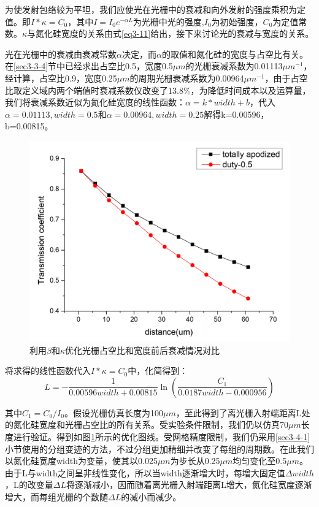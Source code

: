 \documentclass[UTF8,a4paper,12pt]{ctexart}
\numberwithin{equation}{section}
\begin{document}
为使发射包络较为平坦，我们应使光在光栅中的衰减和向外发射的强度乘积为定值。即$I*\kappa=C_0$，其中$I=I_0e^{-\alpha L}$为光栅中光的强度,$I_0$为初始强度，$C_0$为定值常数。$\kappa$与氮化硅宽度的关系由式\ref{eq3-11}给出，接下来讨论光的衰减与宽度的关系。

光在光栅中的衰减由衰减常数$\alpha$决定，而$\alpha$的取值和氮化硅的宽度与占空比有关。在\ref{sec3-3-4}节中已经求出占空比0.5，宽度0.5$\mu m$的光栅衰减系数为0.01113$\mu m^{-1}$，经计算，占空比0.9，宽度0.25$\mu m$的周期光栅衰减系数为0.00964$\mu m^{-1}$，由于占空比取定义域内两个端值时衰减系数仅改变了13.8\%，为降低时间成本以及运算量，我们将衰减系数近似为氮化硅宽度的线性函数：$\alpha = k*width+b$，代入$\alpha=0.01113,width=0.5$和$\alpha=0.00964,width=0.25$解得k=0.00596，b=0.00815。

\begin{figure}[htbp]
\centering
\includegraphics[width=0.8\linewidth]{fig38.png}
\caption{利用$\beta$和$\kappa$优化光栅占空比和宽度前后衰减情况对比}
\label{3-24}
\end{figure}

将求得的线性函数代入$I*\kappa=C_0$中，化简得到：
\begin{equation}
    L=-\frac{1}{0.00596width+0.00815}\ln{\left(\frac{C_1}{0.0187width-0.000956}\right)}
\end{equation}



\noindent 其中$C_1=C_0/I_0$。假设光栅仿真长度为100$\mu m$，至此得到了离光栅入射端距离L处的氮化硅宽度和光栅占空比的所有关系。受实验条件限制，我们仍以仿真70$\mu m$长度进行验证。得到如图\ref{3-24}所示的优化图线。受网格精度限制，我们仍采用\ref{sec3-4-1}小节使用的分组变迹的方法，不过分组更加精细并改变了每组的周期数。在此我们以氮化硅宽度width为变量，使其以0.025$\mu m $为步长从0.25$\mu m$均匀变化至0.5$\mu m$。由于L与width之间呈非线性变化，所以当width逐渐增大时，每增大固定值$\Delta width$，L的改变量$\Delta L$将逐渐减小，因而随着离光栅入射端距离L增大，氮化硅宽度逐渐增大，而每组光栅的个数随$\Delta L$的减小而减少。
\end{document}
